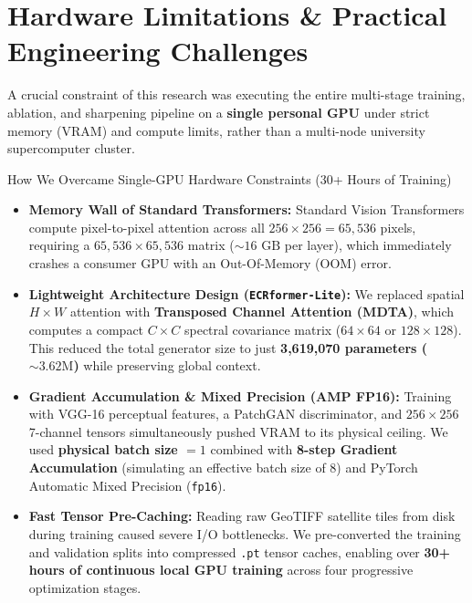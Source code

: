 \documentclass[11pt,a4paper]{article}
\begin{document}
\section{Hardware Limitations \& Practical Engineering Challenges}

A crucial constraint of this research was executing the entire multi-stage training, ablation, and sharpening pipeline on a \textbf{single personal GPU} under strict memory (VRAM) and compute limits, rather than a multi-node university supercomputer cluster.

\begin{hardwarebox}{How We Overcame Single-GPU Hardware Constraints (30+ Hours of Training)}
\begin{itemize}[leftmargin=1.5em, itemsep=3pt, topsep=2pt]
    \item \textbf{Memory Wall of Standard Transformers:} Standard Vision Transformers compute pixel-to-pixel attention across all $256 \times 256 = 65,536$ pixels, requiring a $65,536 \times 65,536$ matrix ($\sim 16\text{ GB}$ per layer), which immediately crashes a consumer GPU with an Out-Of-Memory (OOM) error.
    \item \textbf{Lightweight Architecture Design (\texttt{ECRformer-Lite}):} We replaced spatial $H\times W$ attention with \textbf{Transposed Channel Attention (MDTA)}, which computes a compact $C \times C$ spectral covariance matrix ($64\times 64$ or $128\times 128$). This reduced the total generator size to just \textbf{3,619,070 parameters ($\sim 3.62\text{M}$)} while preserving global context.
    \item \textbf{Gradient Accumulation \& Mixed Precision (AMP FP16):} Training with VGG-16 perceptual features, a PatchGAN discriminator, and $256 \times 256$ 7-channel tensors simultaneously pushed VRAM to its physical ceiling. We used \textbf{physical batch size $= 1$} combined with \textbf{8-step Gradient Accumulation} (simulating an effective batch size of 8) and PyTorch Automatic Mixed Precision (\texttt{fp16}).
    \item \textbf{Fast Tensor Pre-Caching:} Reading raw GeoTIFF satellite tiles from disk during training caused severe I/O bottlenecks. We pre-converted the training and validation splits into compressed \texttt{.pt} tensor caches, enabling over \textbf{30+ hours of continuous local GPU training} across four progressive optimization stages.
\end{itemize}
\end{hardwarebox}

\end{document}

